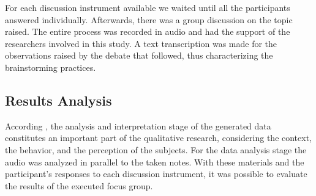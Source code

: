 \documentclass[a4paper,twoside,anonymous]{article}
\begin{document}
For each discussion instrument available we waited until all the participants answered individually.
Afterwards, there was a group discussion on the topic raised.
The entire process was recorded in audio and had the support of the researchers involved in this study.
A text transcription was made for the observations raised by the debate that followed, thus characterizing the brainstorming practices.

\subsection{Results Analysis}

According \cite{Kontio:2008}, the analysis and interpretation stage of the generated data constitutes an important part of the qualitative research, considering the context, the behavior,  and the perception of the subjects.
For the data analysis stage the audio was analyzed in parallel to the taken notes.
With these materials and the participant's responses to each discussion instrument, it was possible to evaluate the results of the executed focus group.
\end{document}
